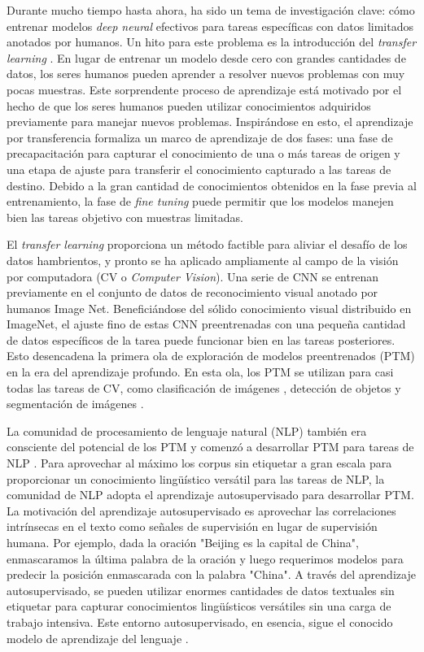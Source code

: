 Durante mucho tiempo hasta ahora, ha sido un tema de investigación clave: cómo entrenar modelos \textit{deep neural} efectivos para tareas específicas con datos limitados anotados por humanos. Un hito para este problema es la introducción del \textit{transfer learning} \parencite{9} \parencite{10}. En lugar de entrenar un modelo desde cero con grandes cantidades de datos, los seres humanos pueden aprender a resolver nuevos problemas con muy pocas muestras. Este sorprendente proceso de aprendizaje está motivado por el hecho de que los seres humanos pueden utilizar conocimientos adquiridos previamente para manejar nuevos problemas. Inspirándose en esto, el aprendizaje por transferencia formaliza un marco de aprendizaje de dos fases: una fase de precapacitación para capturar el conocimiento de una o más tareas de origen y una etapa de ajuste para transferir el conocimiento capturado a las tareas de destino. Debido a la gran cantidad de conocimientos obtenidos en la fase previa al entrenamiento, la fase de \textit{fine tuning} puede permitir que los modelos manejen bien las tareas objetivo con muestras limitadas.  

El \textit{transfer learning} proporciona un método factible para aliviar el desafío de los datos hambrientos, y pronto se ha aplicado ampliamente al campo de la visión por computadora (CV o \textit{Computer Vision}). Una serie de CNN \parencite{78} \parencite{79} \parencite{80} se entrenan previamente en el conjunto de datos de reconocimiento visual anotado por humanos Image Net. Beneficiándose del sólido conocimiento visual distribuido en ImageNet, el ajuste fino de estas CNN preentrenadas con una pequeña cantidad de datos específicos de la tarea puede funcionar bien en las tareas posteriores. Esto desencadena la primera ola de exploración de modelos preentrenados (PTM) en la era del aprendizaje profundo. En esta ola, los PTM se utilizan para casi todas las tareas de CV, como clasificación de imágenes \parencite{81}, detección de objetos \parencite{82} y segmentación de imágenes \parencite{83}.  

La comunidad de procesamiento de lenguaje natural (NLP) también era consciente del potencial de los PTM y comenzó a desarrollar PTM para tareas de NLP \parencite{84}. Para aprovechar al máximo los corpus sin etiquetar a gran escala para proporcionar un conocimiento lingüístico versátil para las tareas de NLP, la comunidad de NLP adopta el aprendizaje autosupervisado \parencite{85} para desarrollar PTM. La motivación del aprendizaje autosupervisado es aprovechar las correlaciones intrínsecas en el texto como señales de supervisión en lugar de supervisión humana. Por ejemplo, dada la oración "Beijing es la capital de China", enmascaramos la última palabra de la oración y luego requerimos modelos para predecir la posición enmascarada con la palabra "China". A través del aprendizaje autosupervisado, se pueden utilizar enormes cantidades de datos textuales sin etiquetar para capturar conocimientos lingüísticos versátiles sin una carga de trabajo intensiva. Este entorno autosupervisado, en esencia, sigue el conocido modelo de aprendizaje del lenguaje \parencite{86}.  

